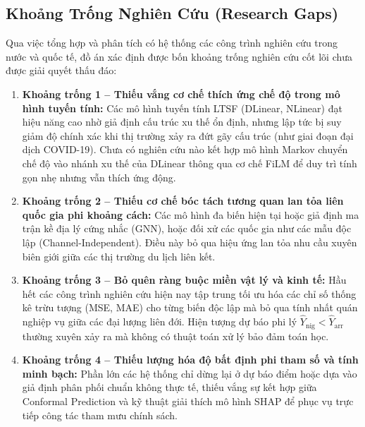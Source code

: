\subsection{Khoảng Trống Nghiên Cứu (Research Gaps)}
Qua việc tổng hợp và phân tích có hệ thống các công trình nghiên cứu trong nước và quốc tế, đồ án xác định được bốn khoảng trống nghiên cứu cốt lõi chưa được giải quyết thấu đáo:
\begin{enumerate}
    \item \textbf{Khoảng trống 1 -- Thiếu vắng cơ chế thích ứng chế độ trong mô hình tuyến tính:} Các mô hình tuyến tính LTSF (DLinear, NLinear) đạt hiệu năng cao nhờ giả định cấu trúc xu thế ổn định, nhưng lập tức bị suy giảm độ chính xác khi thị trường xảy ra đứt gãy cấu trúc (như giai đoạn đại dịch COVID-19). Chưa có nghiên cứu nào kết hợp mô hình Markov chuyển chế độ vào nhánh xu thế của DLinear thông qua cơ chế FiLM để duy trì tính gọn nhẹ nhưng vẫn thích ứng động.
    \item \textbf{Khoảng trống 2 -- Thiếu cơ chế bóc tách tương quan lan tỏa liên quốc gia phi khoảng cách:} Các mô hình đa biến hiện tại hoặc giả định ma trận kề địa lý cứng nhắc (GNN), hoặc đối xử các quốc gia như các mẫu độc lập (Channel-Independent). Điều này bỏ qua hiệu ứng lan tỏa nhu cầu xuyên biên giới giữa các thị trường du lịch liên kết.
    \item \textbf{Khoảng trống 3 -- Bỏ quên ràng buộc miền vật lý và kinh tế:} Hầu hết các công trình nghiên cứu hiện nay tập trung tối ưu hóa các chỉ số thống kê trừu tượng (MSE, MAE) cho từng biến độc lập mà bỏ qua tính nhất quán nghiệp vụ giữa các đại lượng liên đới. Hiện tượng dự báo phi lý $\hat{Y}_{\text{nig}} < \hat{Y}_{\text{arr}}$ thường xuyên xảy ra mà không có thuật toán xử lý bảo đảm toán học.
    \item \textbf{Khoảng trống 4 -- Thiếu lượng hóa độ bất định phi tham số và tính minh bạch:} Phần lớn các hệ thống chỉ dừng lại ở dự báo điểm hoặc dựa vào giả định phân phối chuẩn không thực tế, thiếu vắng sự kết hợp giữa Conformal Prediction và kỹ thuật giải thích mô hình SHAP để phục vụ trực tiếp công tác tham mưu chính sách.
\end{enumerate}


